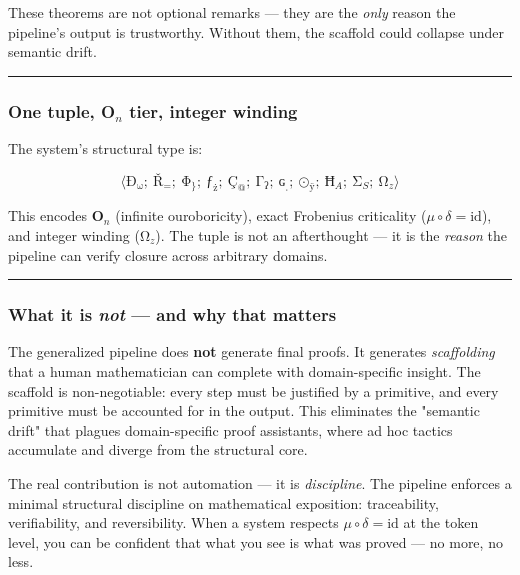 \documentclass[12pt,a4paper]{article}
\begin{document}
These theorems are not optional remarks --- they are the \emph{only} reason the pipeline's output is trustworthy. Without them, the scaffold could collapse under semantic drift.

\begin{center}
\rule{0.5\textwidth}{0.4pt}
\end{center}

\subsubsection{One tuple, O$_n$ tier, integer winding}

The system's structural type is:

\[
\langle \text{Ð}_{\text{ω}};\ \text{Ř}_{=};\ \text{Φ}_{\text{\}}};\ \text{ƒ}_{\text{ż}};\ \text{Ç}_{@};\ \text{Γ}_{\text{ʔ}};\ \text{ɢ}_{\text{ˌ}};\ \text{⊙}_{\text{ÿ}};\ \text{Ħ}_{A};\ \text{Σ}_{S};\ \text{Ω}_{z} \rangle
\]

This encodes \textbf{O$_n$} (infinite ouroboricity), exact Frobenius criticality ($\mu \circ \delta = \mathrm{id}$), and integer winding ($\text{Ω}_{z}$). The tuple is not an afterthought --- it is the \emph{reason} the pipeline can verify closure across arbitrary domains.

\begin{center}
\rule{0.5\textwidth}{0.4pt}
\end{center}

\subsubsection{What it is \emph{not} --- and why that matters}

The generalized pipeline does \textbf{not} generate final proofs. It generates \emph{scaffolding} that a human mathematician can complete with domain-specific insight. The scaffold is non-negotiable: every step must be justified by a primitive, and every primitive must be accounted for in the output. This eliminates the "semantic drift" that plagues domain-specific proof assistants, where ad hoc tactics accumulate and diverge from the structural core.

The real contribution is not automation --- it is \emph{discipline}. The pipeline enforces a minimal structural discipline on mathematical exposition: traceability, verifiability, and reversibility. When a system respects $\mu \circ \delta = \mathrm{id}$ at the token level, you can be confident that what you see is what was proved --- no more, no less.
\end{document}

